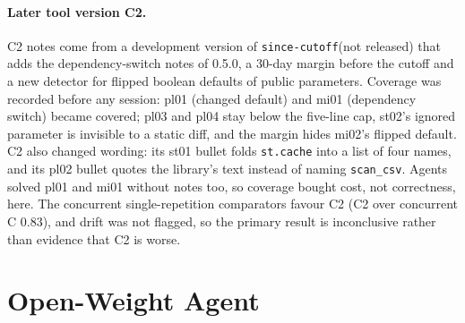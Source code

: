 \documentclass[11pt]{article}
\newcommand{\tool}{\texttt{since-cutoff}\xspace}
\newcommand{\code}[1]{\texttt{#1}}
\begin{document}
\paragraph{Later tool version C2.}
C2 notes come from a development version of \tool (not released) that adds the dependency-switch notes of 0.5.0, a 30-day margin before the cutoff and a new detector for flipped boolean defaults of public parameters.
Coverage was recorded before any session: pl01 (changed default) and mi01 (dependency switch) became covered; pl03 and pl04 stay below the five-line cap, st02's ignored parameter is invisible to a static diff, and the margin hides mi02's flipped default.
C2 also changed wording: its st01 bullet folds \code{st.cache} into a list of four names, and its pl02 bullet quotes the library's text instead of naming \code{scan\_csv}.
Agents solved pl01 and mi01 without notes too, so coverage bought cost, not correctness, here.
The concurrent single-repetition comparators favour C2 (C2 over concurrent C 0.83), and drift was not flagged, so the primary result is inconclusive rather than evidence that C2 is worse.

\section{Open-Weight Agent}
\label{app:open}
\end{document}
